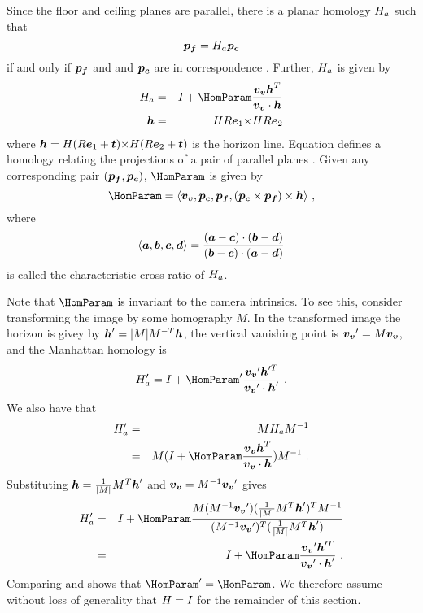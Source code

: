 Since the floor and ceiling planes are parallel, there is a planar
homology $\Hcf$ such that
\begin{equation}
  \FloorPt = \Hcf \CeilPt
\end{equation}
if and only if $\pfloor$ and and $\pceil$ are in correspondence
\cite{Criminisi01}. Further, $\Hcf$ is given by \cite{Criminisi01}
\begin{eqnarray}
  \label{eq:manhattanhom}
  \Hcf &=& I + \HomParam\frac{\vvpt\horizon^T}{\vvpt \cdot \horizon}\\
  \horizon &=& \CamMatrix\CamR\ex \cross \CamMatrix\CamR\ey
\end{eqnarray}
where $\horizon = \CamProj{\ex} \cross \CamProj{\ey}$ is
the horizon line. Equation  defines a homology
relating the projections of a pair of parallel planes
\cite{Criminisi01}. Given any corresponding pair $(\FloorPt,\CeilPt)$,
$\HomParam$ is given by \cite{Criminisi01}
\begin{equation}
  \HomParam = 
  \langle\vvpt,\CeilPt,\FloorPt,(\CeilPt\times\FloorPt)\times\horizon\rangle ~,
\end{equation}
where
\begin{equation}
  \langle \vect{a},\vect{b},\vect{c},\vect{d} \rangle = \frac{
    (\vect{a}-\vect{c}) \cdot (\vect{b}-\vect{d})
  }{
    (\vect{b}-\vect{c}) \cdot (\vect{a}-\vect{d})
  }
\end{equation}
is called the characteristic cross ratio of $\Hcf$.

Note that $\HomParam$ is invariant to the camera intrinsics. To see
this, consider transforming the image by some homography $M$. In the
transformed image the horizon is givey by
$\horizon'=|M|M^{-T}\horizon$, the vertical vanishing point is
$\vvpt'=M\vvpt$, and the Manhattan homology is
\begin{equation}
  \label{eq:homprime}
  \Hcf' = I + \HomParam'\frac{\vvpt'\horizon'^T}{\vvpt'\cdot\horizon'}~.
\end{equation}
We also have that
\begin{eqnarray}
  \Hcf' &=& M \Hcf M^{-1} \\
  &=& M (I + \HomParam\frac{\vvpt\horizon^T}{\vvpt \cdot
    \horizon})M^{-1} ~.\\
\end{eqnarray}
Substituting $\horizon=\frac{1}{|M|}M^T\horizon'$ and
$\vvpt=M^{-1}\vvpt'$ gives
\begin{eqnarray}
  \Hcf' &=& I + \HomParam
    \frac{M(M^{-1}\vvpt')(\frac{1}{|M|}M^T\horizon')^T M^{-1}}
         {(M^{-1}\vvpt')^T(\frac{1}{|M|}M^T\horizon')}\\
  \label{eq:comparehom}
  &=& I + \HomParam\frac{\vvpt'\horizon'^T}
                        {\vvpt'\cdot\horizon'} ~.
\end{eqnarray}
Comparing  and  shows that
$\HomParam'=\HomParam$. We therefore assume without loss of generality
that $\CamMatrix=I$ for the remainder of this section.

